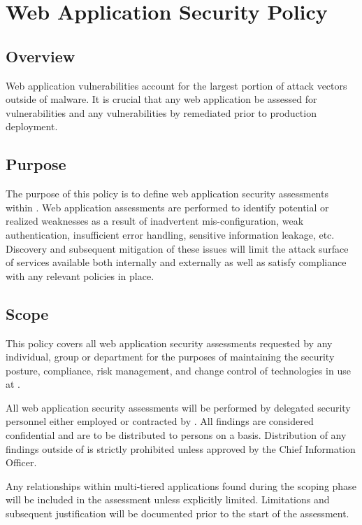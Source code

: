 \chapter{Web Application Security Policy}
\CommonIntroduction

\section{Overview}
Web application vulnerabilities account for the largest portion of attack vectors outside of malware.  
It is crucial that any web application be assessed for vulnerabilities and any vulnerabilities by remediated prior to production deployment.

\section{Purpose}
The purpose of this policy is to define web application security assessments within \CompanyName{}.  
Web application assessments are performed to identify potential or realized weaknesses as a result of inadvertent mis-configuration, weak authentication, insufficient error handling, sensitive information leakage, etc.  
Discovery and subsequent mitigation of these issues will limit the attack surface of \CompanyName{} services available both internally and externally as well as satisfy compliance with any relevant policies in place.

\section{Scope}
This policy covers all web application security assessments requested by any individual, group or department for the purposes of maintaining the security posture, compliance, risk management, and change control of technologies in use at \CompanyName{}.

All web application security assessments will be performed by delegated security personnel either employed or contracted by \CompanyName{}.  
All findings are considered confidential and are to be distributed to persons on a  basis.  
Distribution of any findings outside of \CompanyName{} is strictly prohibited unless approved by the Chief Information Officer.

Any relationships within multi-tiered applications found during the scoping phase will be included in the assessment unless explicitly limited.  
Limitations and subsequent justification will be documented prior to the start of the assessment.

